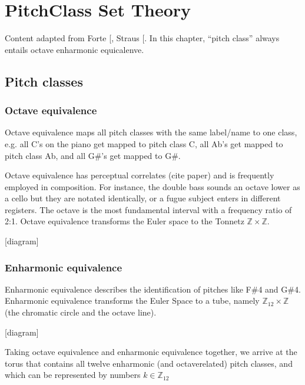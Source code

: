 \documentclass[letterpaper,10pt,english]{sphinxmanual}
\begin{document}
\chapter{Pitch\sphinxhyphen{}Class Set Theory}
\label{\detokenize{3_set_theory:pitch-class-set-theory}}\label{\detokenize{3_set_theory::doc}}
Content adapted from Forte {[}\sphinxcite{8_bibliography:id7}{]}, Straus {[}\sphinxcite{8_bibliography:id3}{]}.
In this chapter, “pitch class” always entails octave  enharmonic equicalenve.


\section{Pitch classes}
\label{\detokenize{3_set_theory:pitch-classes}}

\subsection{Octave equivalence}
\label{\detokenize{3_set_theory:octave-equivalence}}
Octave equivalence maps all pitch classes with the same label/name to one class,
e.g. all C’s on the piano get mapped to pitch class C, all Ab’s get mapped to pitch class Ab,
and all G\#’s get mapped to G\#.

Octave equivalence has perceptual correlates (cite paper) and is frequently employed in composition.
For instance, the double bass sounds an octave lower as a cello but they are notated identically,
or a fugue subject enters in different registers.
The octave is the most fundamental interval with a frequency ratio of 2:1.
Octave equivalence transforms the Euler space to the Tonnetz \(\mathbb{Z}\times\mathbb{Z}\).

{[}diagram{]}


\subsection{Enharmonic equivalence}
\label{\detokenize{3_set_theory:enharmonic-equivalence}}
Enharmonic equivalence describes the identification of pitches like F\#4 and G\#4.
Enharmonic equivalence transforms the Euler Space to a tube, namely \(\mathbb{Z}_{12} \times \mathbb{Z}\)
(the chromatic circle and the octave line).

{[}diagram{]}

Taking octave equivalence and enharmonic equivalence together,
we arrive at the torus that contains all twelve enharmonic (and octave\sphinxhyphen{}related) pitch classes,
and which can be represented by numbers \(k\in \mathbb{Z}_{12}\)
\end{document}
